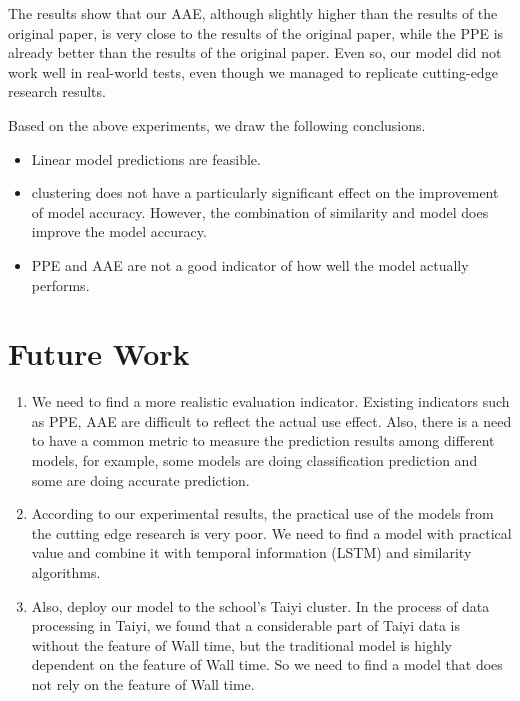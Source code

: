 \documentclass[conference,compsoc]{IEEEtran}
\begin{document}
The results show that our AAE, although slightly higher than the results of the original paper, is very close to the results of the original paper, while the PPE is already better than the results of the original paper. Even so, our model did not work well in real-world tests, even though we managed to replicate cutting-edge research results.

Based on the above experiments, we draw the following conclusions.
\begin{itemize}
	\item Linear model predictions are feasible.
	\item clustering does not have a particularly significant effect on the improvement of model accuracy. However, the combination of similarity and model does improve the model accuracy.
	\item PPE and AAE are not a good indicator of how well the model actually performs.
\end{itemize}

\section{Future Work}

\begin{enumerate}
	\item We need to find a more realistic evaluation indicator. Existing indicators such as PPE, AAE are difficult to reflect the actual use effect. Also, there is a need to have a common metric to measure the prediction results among different models, for example, some models are doing classification prediction and some are doing accurate prediction.
	
	\item According to our experimental results, the practical use of the models from the cutting edge research is very poor. We need to find a model with practical value and combine it with temporal information (LSTM) and similarity algorithms.
	
	\item Also, deploy our model to the school's Taiyi cluster. In the process of data processing in Taiyi, we found that a considerable part of Taiyi data is without the feature of Wall time, but the traditional model is highly dependent on the feature of Wall time. So we need to find a model that does not rely on the feature of Wall time.
\end{enumerate}
\end{document}
